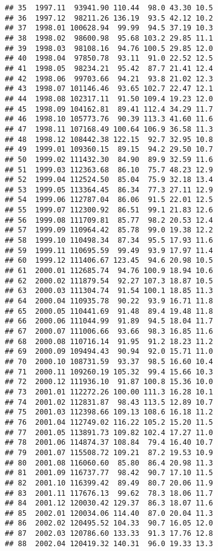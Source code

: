 \documentclass[]{article}
\begin{document}
\begin{verbatim}
## 35  1997.11  93941.90 110.44  98.0 43.30 10.5
## 36  1997.12  98211.26 136.19  93.5 42.12 10.2
## 37  1998.01 100628.94  99.99  94.5 37.19 10.3
## 38  1998.02  98600.98  95.68 103.2 29.85 11.1
## 39  1998.03  98108.16  94.76 100.5 29.85 12.0
## 40  1998.04  97850.78  93.11  91.0 22.52 12.5
## 41  1998.05  98234.21  95.42  87.7 21.41 12.4
## 42  1998.06  99703.66  94.21  93.8 21.02 12.3
## 43  1998.07 101146.46  93.65 102.7 22.47 12.1
## 44  1998.08 102317.11  91.50 109.4 19.23 12.0
## 45  1998.09 104162.81  89.41 112.4 34.29 11.7
## 46  1998.10 105773.76  90.39 113.3 41.60 11.6
## 47  1998.11 107168.49 100.64 106.9 36.58 11.3
## 48  1998.12 108442.38 122.15  92.7 32.95 10.8
## 49  1999.01 109360.15  89.15  94.2 29.50 10.7
## 50  1999.02 111432.30  84.90  89.9 32.59 11.6
## 51  1999.03 112363.68  86.10  75.7 48.23 12.9
## 52  1999.04 112524.50  85.04  75.9 32.18 13.4
## 53  1999.05 113364.45  86.34  77.3 27.11 12.9
## 54  1999.06 112787.04  86.06  91.5 22.01 12.5
## 55  1999.07 112300.92  86.51  99.1 21.83 12.6
## 56  1999.08 111709.81  85.77  98.2 20.53 12.4
## 57  1999.09 110964.42  85.78  99.0 19.38 12.2
## 58  1999.10 110498.34  87.34  95.5 17.93 11.6
## 59  1999.11 110695.59  99.49  93.9 17.97 11.4
## 60  1999.12 111406.67 123.45  94.6 20.98 10.5
## 61  2000.01 112685.74  94.76 100.9 18.94 10.6
## 62  2000.02 111879.54  92.27 107.3 18.87 10.5
## 63  2000.03 111304.74  91.54 100.1 18.85 11.3
## 64  2000.04 110935.78  90.22  93.9 16.71 11.8
## 65  2000.05 110441.69  91.48  89.4 19.48 11.8
## 66  2000.06 111044.99  91.89  94.5 18.04 11.7
## 67  2000.07 111006.66  93.66  98.3 16.85 11.6
## 68  2000.08 110716.14  91.95  91.2 18.23 11.2
## 69  2000.09 109494.43  90.94  92.0 15.71 11.0
## 70  2000.10 108731.59  93.37  98.5 16.60 10.4
## 71  2000.11 109260.19 105.32  99.4 15.66 10.3
## 72  2000.12 111936.10  91.87 100.8 15.36 10.0
## 73  2001.01 112272.26 100.00 111.3 16.28 10.1
## 74  2001.02 112831.87  98.43 113.5 12.89 10.7
## 75  2001.03 112398.66 109.13 108.6 16.18 11.2
## 76  2001.04 112749.02 116.22 105.2 15.20 11.5
## 77  2001.05 113891.73 109.82 102.4 17.27 11.0
## 78  2001.06 114874.37 108.84  79.4 16.40 10.7
## 79  2001.07 115508.72 109.21  87.2 19.53 10.9
## 80  2001.08 116060.60  85.80  86.4 20.98 11.3
## 81  2001.09 116737.77  98.42  90.7 17.10 11.5
## 82  2001.10 116399.42  89.49  80.7 20.06 11.9
## 83  2001.11 117676.13  99.62  78.3 18.06 11.7
## 84  2001.12 120030.42 129.37  86.3 18.07 11.6
## 85  2002.01 120034.06 114.40  87.0 20.04 11.3
## 86  2002.02 120495.52 104.33  90.7 16.05 12.0
## 87  2002.03 120786.60 133.33  91.3 17.76 12.8
## 88  2002.04 120419.32 140.31  96.0 19.33 13.3

\end{verbatim}
\end{document}

